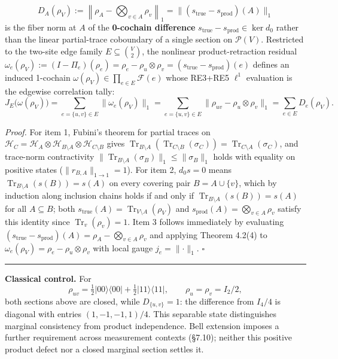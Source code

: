 \documentclass[
  11pt,
]{article}
\begin{document}
\[
D_A(\rho_V) := \left\lVert \rho_A - \bigotimes_{v\in A}\rho_v\right\rVert_1 = \bigl\lVert (s_{\mathrm{true}} - s_{\mathrm{prod}})(A)\bigr\rVert_1
\]
is the fiber norm at \(A\) of the \textbf{0-cochain difference} \(s_{\mathrm{true}} - s_{\mathrm{prod}} \in \ker d_0\) rather than the linear partial-trace coboundary of a single section on \(\mathcal{P}(V)\). Restricted to the two-site edge family \(E \subseteq \binom{V}{2}\), the nonlinear product-retraction residual \(\omega_e(\rho_V) := (I - \Pi_e)(\rho_e) = \rho_e - \rho_u\otimes\rho_v = (s_{\mathrm{true}} - s_{\mathrm{prod}})(e)\) defines an induced 1-cochain \(\omega(\rho_V) \in \prod_{e\in E}\mathcal{F}(e)\) whose RE3+RE5 \(\ell^1\) evaluation is the edgewise correlation tally:
\[
J_E\bigl(\omega(\rho_V)\bigr) = \sum_{e=\{u,v\}\in E} \lVert \omega_e(\rho_V)\rVert_1 = \sum_{e=\{u,v\}\in E} \lVert \rho_{uv} - \rho_u\otimes\rho_v\rVert_1 = \sum_{e\in E} D_e(\rho_V).
\]

\emph{Proof.} For item 1, Fubini's theorem for partial traces on \(\mathcal{H}_C = \mathcal{H}_A \otimes \mathcal{H}_{B\setminus A} \otimes \mathcal{H}_{C\setminus B}\) gives \(\operatorname{Tr}_{B\setminus A}(\operatorname{Tr}_{C\setminus B}(\sigma_C)) = \operatorname{Tr}_{C\setminus A}(\sigma_C)\), and trace-norm contractivity \(\lVert\operatorname{Tr}_{B\setminus A}(\sigma_B)\rVert_1 \le \lVert\sigma_B\rVert_1\) holds with equality on positive states (\(\lVert r_{B,A}\rVert_{1\to 1}=1\)). For item 2, \(d_0 s = 0\) means \(\operatorname{Tr}_{B\setminus A}(s(B)) = s(A)\) on every covering pair \(B = A\cup\{v\}\), which by induction along inclusion chains holds if and only if \(\operatorname{Tr}_{B\setminus A}(s(B)) = s(A)\) for all \(A\subseteq B\); both \(s_{\mathrm{true}}(A)=\operatorname{Tr}_{V\setminus A}(\rho_V)\) and \(s_{\mathrm{prod}}(A)=\bigotimes_{v\in A}\rho_v\) satisfy this identity since \(\operatorname{Tr}_v(\rho_v)=1\). Item 3 follows immediately by evaluating \((s_{\mathrm{true}} - s_{\mathrm{prod}})(A) = \rho_A - \bigotimes_{v\in A}\rho_v\) and applying Theorem 4.2(4) to \(\omega_e(\rho_V) = \rho_e - \rho_u\otimes\rho_v\) with local gauge \(j_e = \lVert\cdot\rVert_1\). \(\square\)

\begin{center}\rule{0.5\linewidth}{0.5pt}\end{center}

\textbf{Classical control.} For
\[
\rho_{uv}=\tfrac12|00\rangle\langle00|+\tfrac12|11\rangle\langle11|,
\qquad \rho_u=\rho_v=I_2/2,
\]
both sections above are closed, while \(D_{\{u,v\}}=1\): the difference
from \(I_4/4\) is diagonal with entries \((1,-1,-1,1)/4\). This separable
state distinguishes marginal consistency from product independence.
Bell extension imposes a further requirement across measurement contexts
(§7.10); neither this positive product defect nor a closed marginal
section settles it.
\end{document}
